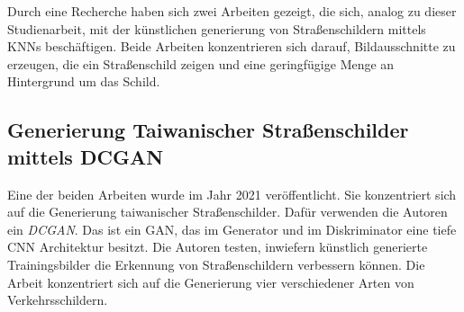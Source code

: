 Durch eine Recherche haben sich zwei Arbeiten gezeigt, die sich, analog zu dieser Studienarbeit, mit der künstlichen generierung von Straßenschildern mittels \acp{KNN} beschäftigen. Beide Arbeiten konzentrieren sich darauf, Bildausschnitte zu erzeugen, die ein Straßenschild zeigen und eine geringfügige Menge an Hintergrund um das Schild.

\subsection{Generierung Taiwanischer Straßenschilder mittels DCGAN}
\label{chap:vorherige-arbeiten-taiwan}
Eine der beiden Arbeiten wurde im Jahr 2021 veröffentlicht. Sie konzentriert sich auf die Generierung taiwanischer Straßenschilder. Dafür verwenden die Autoren ein \emph{DCGAN}. Das ist ein \ac{GAN}, das im Generator und im Diskriminator eine tiefe \ac{CNN} Architektur besitzt. Die Autoren testen, inwiefern künstlich generierte Trainingsbilder die Erkennung von Straßenschildern verbessern können. Die Arbeit konzentriert sich auf die Generierung vier verschiedener Arten von Verkehrsschildern. \cite{taiwanGAN}

